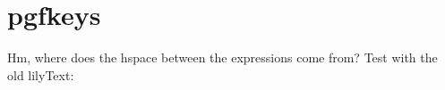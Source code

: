 


\usepackage{pgfkeys}


\newcommand\testpgf[2][]{%
	\pgfkeys{/lilyglpyh, #1}
	{{\fontspec[Scale=\lilyglyphScale]{Emmentaler-11} \XeTeXglyph\XeTeXglyphindex"#2" }}
}



\section*{pgfkeys}



Hm, where does the hspace between the expressions come from? Test with the old lilyText:


